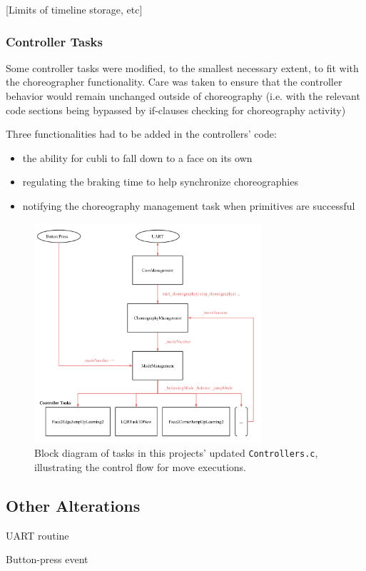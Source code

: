 [Limits of timeline storage, etc]

\subsubsection{Controller Tasks}

Some controller tasks were modified, to the smallest necessary extent, to fit with the choreographer functionality. Care was taken to ensure that the controller behavior would remain unchanged outside of choreography (i.e. with the relevant code sections being bypassed by if-clauses checking for choreography activity)

Three functionalities had to be added in the controllers' code:
\begin{itemize}
\item the ability for cubli to fall down to a face on its own
\item regulating the braking time to help synchronize choreographies
\item notifying the choreography management task when primitives are successful
\end{itemize}

\begin{figure}[ht]
   \centering
   \includegraphics[width=0.75\textwidth]{img/ControllersChoreography.png}
   \caption{Block diagram of tasks in this projects' updated \texttt{Controllers.c}, illustrating the control flow for move executions.}
   \label{img:ControllersChoreography}
\end{figure}

\subsection{Other Alterations}

UART routine

Button-press event


    



